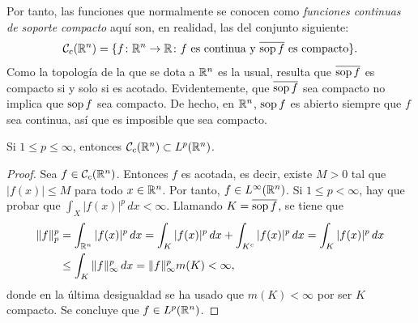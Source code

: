\documentclass[a4paper, 11pt, oneside]{report}
\begin{document}
Por tanto, las funciones que normalmente se conocen como \emph{funciones continuas de soporte compacto} aquí son, en realidad, las del conjunto siguiente: 
\[\mathcal{C}_c(\mathbb R^n) = \{f \colon \mathbb R^n \to \mathbb R \colon f \textup{ es continua y } \overline{\textup{sop}\, f} \textup{ es compacto}\}.\]
Como la topología de la que se dota a $\mathbb R^n$ es la usual, resulta que $\overline{\textup{sop}\, f}$ es compacto si y solo si es acotado. Evidentemente, que $\overline{\textup{sop}\, f}$ sea compacto no implica que $\textup{sop}\, f$ sea compacto. De hecho, en $\mathbb R^n$, $\textup{sop}\, f$ es abierto siempre que $f$ sea continua, así que es imposible que sea compacto.

\begin{proposition}
  Si $1\leq p \leq \infty$, entonces $\mathcal{C}_c(\mathbb R^n) \subset L^p(\mathbb R^n)$.
\end{proposition}

\begin{proof}
  Sea $f \in \mathcal{C}_c(\mathbb R^n)$. Entonces $f$ es acotada, es decir, existe $M>0$ tal que $|f(x)| \leq M$ para todo $x \in \mathbb R^n$. Por tanto, $f \in L^\infty(\mathbb R^n)$. Si $1 \leq p < \infty$, hay que probar que $\int_X |f(x)|^p \, dx < \infty$. Llamando $K = \overline{\textup{sop}\, f}$, se tiene que
  \[
  \begin{aligned}[t]
  \|f\|_p^p&=\int_{\mathbb R^n} |f(x)|^p \, dx = \int_K |f(x)|^p \, dx + \int_{K^c} |f(x)|^p \, dx = \int_K |f(x)|^p \, dx \\
  &\leq \int_K \|f\|_\infty^p \, dx = \|f\|_\infty^p m(K) < \infty,
  \end{aligned}
  \]
  donde en la última desigualdad se ha usado que $m(K)<\infty$ por ser $K$ compacto. Se concluye que $f \in L^p(\mathbb R^n)$.
\end{proof}
\end{document}
